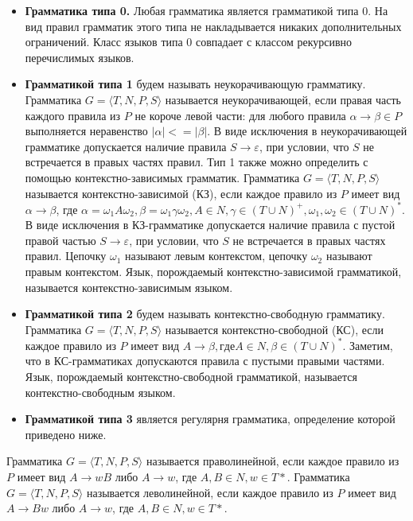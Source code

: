 \begin{itemize}
    \item \textbf{Грамматика типа 0.} Любая грамматика является грамматикой типа 0. На вид правил грамматик этого типа не накладывается никаких дополнительных ограничений. Класс языков типа 0 совпадает с классом рекурсивно перечислимых языков.
    
    \item \textbf{Грамматикой типа 1} будем называть неукорачивающую грамматику. Грамматика $G = \langle T, N, P, S \rangle$ называется неукорачивающей, если правая часть каждого правила из $P$ не короче левой части: для любого правила $\alpha \rightarrow \beta \in P$ выполняется неравенство $| \alpha | <= | \beta |$. В виде исключения в неукорачивающей грамматике допускается наличие правила $S \rightarrow \varepsilon$, при условии, что $S$ не встречается в правых частях правил. Тип 1 также можно определить с помощью контекстно-зависимых грамматик. Грамматика $G = \langle T, N, P, S \rangle$ называется контекстно-зависимой (КЗ), если каждое правило из $P$ имеет вид $\alpha \rightarrow \beta$, где $\alpha = \omega_1 A\omega_2, \beta = \omega_1\gamma\omega_2, A \in N, \gamma \in (T \cup N )^+   , \omega_1, \omega_2 \in (T \cup N)^*$. В виде исключения в КЗ-грамматике допускается наличие правила с пустой правой частью $S \rightarrow \varepsilon$, при условии, что $S$ не встречается в правых частях правил. Цепочку $\omega_1$ называют левым контекстом, цепочку $\omega_2$ называют правым контекстом. Язык, порождаемый контекстно-зависимой грамматикой, называется контекстно-зависимым языком. 
    
    \item \textbf{Грамматикой типа 2} будем называть контекстно-свободную грамматику. Грамматика $G = \langle T, N, P, S \rangle$ называется контекстно-свободной (КС), если каждое правило из $P$ имеет вид $A \rightarrow \beta, где A \in N, \beta \in ( T \cup N )^*$. Заметим, что в КС-грамматиках допускаются правила с пустыми правыми частями.  Язык, порождаемый контекстно-свободной грамматикой, называется контекстно-свободным языком. 

    \item \textbf{Грамматикой типа 3} является регулярня грамматика, определение которой приведено ниже.
     
\end{itemize}

Грамматика $G = \langle T, N, P, S \rangle$ называется праволинейной, если каждое правило из $P$ имеет вид $A \rightarrow wB$ либо $A \rightarrow w$, где $A, B \in N, w \in T*$. Грамматика $G = \langle T, N, P, S \rangle$ называется леволинейной, если каждое правило из $P$ имеет вид $A \rightarrow Bw$ либо $A \rightarrow w$, где $A, B \in N, w \in T*$. 

